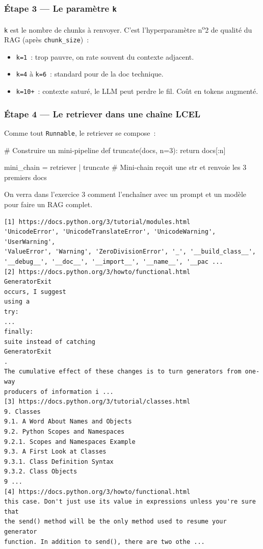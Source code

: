 \documentclass[11pt,a4paper]{article}
\begin{document}
\subsubsection*{Étape 3 — Le paramètre \texttt{k}}

\texttt{k} est le nombre de chunks à renvoyer. C'est l'hyperparamètre
n\textsuperscript{o}2 de qualité du RAG (après \texttt{chunk\_size})~:

\begin{itemize}[leftmargin=*]
  \item \texttt{k=1}~: trop pauvre, on rate souvent du contexte adjacent.
  \item \texttt{k=4} à \texttt{k=6}~: standard pour de la doc technique.
  \item \texttt{k=10+}~: contexte saturé, le LLM peut perdre le fil.
        Coût en tokens augmenté.
\end{itemize}

\subsubsection*{Étape 4 — Le retriever dans une chaîne LCEL}

Comme tout \texttt{Runnable}, le retriever se compose~:

\begin{pythoncode}
# Construire un mini-pipeline
def truncate(docs, n=3):
    return docs[:n]

mini_chain = retriever | truncate
# Mini-chain reçoit une str et renvoie les 3 premiers docs
\end{pythoncode}

On verra dans l'exercice 3 comment l'enchaîner avec un prompt et un
modèle pour faire un RAG complet.

\begin{tcolorbox}[
  colback=white,
  colframe=black!50,
  coltitle=black,
  fonttitle=\footnotesize\bfseries,
  fontupper=\footnotesize,
  title=Sortie de l'exécution,
  breakable,
]
\begin{verbatim}
[1] https://docs.python.org/3/tutorial/modules.html
'UnicodeError', 'UnicodeTranslateError', 'UnicodeWarning', 'UserWarning',
'ValueError', 'Warning', 'ZeroDivisionError', '_', '__build_class__',
'__debug__', '__doc__', '__import__', '__name__', '__pac ...
[2] https://docs.python.org/3/howto/functional.html
GeneratorExit
occurs, I suggest
using a
try:
...
finally:
suite instead of catching
GeneratorExit
.
The cumulative effect of these changes is to turn generators from one-way
producers of information i ...
[3] https://docs.python.org/3/tutorial/classes.html
9. Classes
9.1. A Word About Names and Objects
9.2. Python Scopes and Namespaces
9.2.1. Scopes and Namespaces Example
9.3. A First Look at Classes
9.3.1. Class Definition Syntax
9.3.2. Class Objects
9 ...
[4] https://docs.python.org/3/howto/functional.html
this case. Don't just use its value in expressions unless you're sure that
the send() method will be the only method used to resume your generator
function. In addition to send(), there are two othe ...
\end{verbatim}
\end{tcolorbox}
\end{document}
